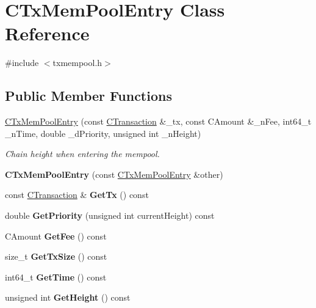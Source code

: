 \hypertarget{class_c_tx_mem_pool_entry}{}\section{C\+Tx\+Mem\+Pool\+Entry Class Reference}
\label{class_c_tx_mem_pool_entry}


{\ttfamily \#include $<$txmempool.\+h$>$}

\subsection*{Public Member Functions}
\begin{DoxyCompactItemize}
\item 
\mbox{\label{class_c_tx_mem_pool_entry_a2ceb48d4c37f0308e97f57e237b50a67}} 
\mbox{\hyperlink{class_c_tx_mem_pool_entry_a2ceb48d4c37f0308e97f57e237b50a67}{C\+Tx\+Mem\+Pool\+Entry}} (const \mbox{\hyperlink{class_c_transaction}{C\+Transaction}} \&\+\_\+tx, const C\+Amount \&\+\_\+n\+Fee, int64\+\_\+t \+\_\+n\+Time, double \+\_\+d\+Priority, unsigned int \+\_\+n\+Height)
\begin{DoxyCompactList}\small\item\em Chain height when entering the mempool. \end{DoxyCompactList}\item 
\mbox{\label{class_c_tx_mem_pool_entry_ad62eaba6adc7ec36487ae690b5b93148}} 
{\bfseries C\+Tx\+Mem\+Pool\+Entry} (const \mbox{\hyperlink{class_c_tx_mem_pool_entry}{C\+Tx\+Mem\+Pool\+Entry}} \&other)
\item 
\mbox{\label{class_c_tx_mem_pool_entry_a2deed4202061edf8b040a3f554417c20}} 
const \mbox{\hyperlink{class_c_transaction}{C\+Transaction}} \& {\bfseries Get\+Tx} () const
\item 
\mbox{\label{class_c_tx_mem_pool_entry_a189d5dbafa6e955524692c0743dc0e0b}} 
double {\bfseries Get\+Priority} (unsigned int current\+Height) const
\item 
\mbox{\label{class_c_tx_mem_pool_entry_addd42d65919922f8d864c702aa9a7cfb}} 
C\+Amount {\bfseries Get\+Fee} () const
\item 
\mbox{\label{class_c_tx_mem_pool_entry_a89325fcaa8efbd1d6fe68c39d7d676b0}} 
size\+\_\+t {\bfseries Get\+Tx\+Size} () const
\item 
\mbox{\label{class_c_tx_mem_pool_entry_a9da5719dfd04508342009bea9c752160}} 
int64\+\_\+t {\bfseries Get\+Time} () const
\item 
\mbox{\label{class_c_tx_mem_pool_entry_a319f8093929fc5b6c3c66ba53ac172b5}} 
unsigned int {\bfseries Get\+Height} () const
\end{DoxyCompactItemize}


